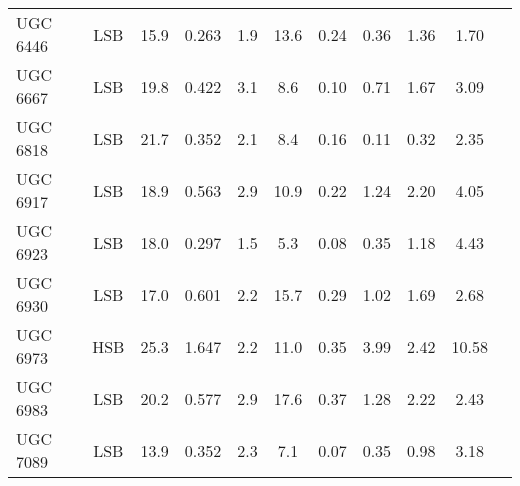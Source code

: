 \documentclass[preprint,aps]{revtex4}
\begin{document}
\begin{table}
\begin{tabular}{l c c c c c c c c c c}
UGC 6446&LSB &15.9 &  0.263    & 1.9 &13.6 &0.24 &\phantom{0}0.36 & 1.36 &
\phantom{0}1.70 &    \cite{Verheijen2001} \cite{Sanders1998} \cite{Tully1997b} \cite{Sanders1998}  
\\
UGC 6667&LSB& 19.8 &   0.422   &3.1& \phantom{0}8.6 &0.10 & \phantom{0}0.71 & 1.67&
\phantom{0}3.09 &   \cite{Verheijen2001} \cite{Sanders1998} \cite{Tully1997a} \cite{Sanders1998}    \\
UGC 6818&LSB& 21.7 &   0.352   &2.1 & \phantom{0}8.4 & 0.16 & \phantom{0}0.11 & 0.32 &
\phantom{0}2.35 &   \cite{Verheijen2001} \cite{Sanders1998} \cite{Tully1997a} \cite{Sanders1998}    \\
UGC 6917&LSB& 18.9 &  0.563    & 2.9 & 10.9 &0.22 &\phantom{0}1.24 &2.20
&\phantom{0}4.05 &    \cite{Verheijen2001} \cite{Sanders1998} \cite{Tully1997a} \cite{Sanders1998}  
 \\
UGC 6923&LSB& 18.0 &  0.297    & 1.5 & \phantom{0}5.3 &0.08 & \phantom{0}0.35 & 1.18 &
\phantom{0}4.43 &    \cite{Verheijen2001} \cite{Sanders1998} \cite{Tully1997b} \cite{Sanders1998}  
 \\
UGC 6930 & LSB & 17.0 &   0.601  & 2.2 & 15.7 & 0.29 & \phantom{0}1.02 &
1.69 & \phantom{0}2.68 &     \cite{Verheijen2001} \cite{Sanders1998} \cite{Tully1997a} \cite{Sanders1998}  
\\
UGC 6973&HSB & 25.3 &  1.647    & 2.2 & 11.0 & 0.35 & \phantom{0}3.99 & 2.42
& 10.58&     \cite{Verheijen2001} \cite{Sanders1998} \cite{Tully1997b} \cite{Sanders1998}  
\\
UGC 6983&LSB & 20.2&   0.577   & 2.9 &17.6 & 0.37 & \phantom{0}1.28 & 2.22 &
\phantom{0}2.43 &   \cite{Verheijen2001} \cite{Sanders1998} \cite{Tully1997a} \cite{Sanders1998}    \\
UGC 7089&LSB& 13.9 &   0.352   & 2.3 & \phantom{0}7.1 &0.07 & \phantom{0}0.35 & 0.98 &
\phantom{0}3.18 &   \cite{Verheijen2001} \cite{Sanders1998} \cite{Tully1997a} \cite{Sanders1998}    \\
\hline
\end{tabular}
\label{table:uma}
\end{table}
\end{document}
